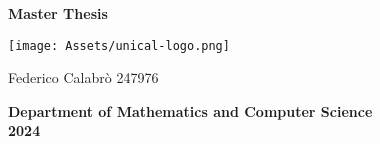 \vspace*{\fill}
\begin{center}
    \large\textbf{Master Thesis}
    
    \vspace{1.5cm}
    \texttt{[image: Assets/unical-logo.png]}
    \vspace{1cm}
    
    \large Federico Calabrò 247976
    
    \vspace{2cm}
    
    \large\textbf{Department of Mathematics and Computer Science \\ 2024}
\end{center}
\vspace*{\fill}